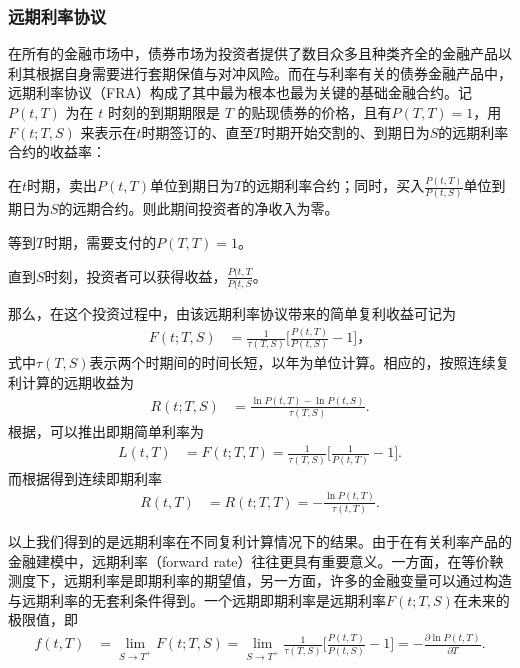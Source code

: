\subsubsection{远期利率协议}
在所有的金融市场中，债券市场为投资者提供了数目众多且种类齐全的金融产品以利其根据自身需要进行套期保值与对冲风险。而在与利率有关的债券金融产品中，远期利率协议（FRA）构成了其中最为根本也最为关键的基础金融合约。记$P(t,T)$ 为在 $t$ 时刻的到期期限是 $T$ 的贴现债券的价格，且有$P(T,T)=1$，用 $F(t; T, S)$ 来表示在$t$时期签订的、直至$T$时期开始交割的、到期日为$S$的远期利率合约的收益率：
\begin{compactitem}
 \item 在$t$时期，卖出$P(t,T)$单位到期日为$T$的远期利率合约；同时，买入$\frac{P(t,T)}{P(t,S)}$单位到期日为$S$的远期合约。则此期间投资者的净收入为零。
 \item 等到$T$时期，需要支付的$P(T,T)=1$。
 \item 直到$S$时刻，投资者可以获得收益，$\frac{P(t,T}{P(t,S}$。
\end{compactitem}
那么，在这个投资过程中，由该远期利率协议带来的简单复利收益可记为
\begin{align}
F(t; T, S) &= \frac{1}{\tau(T,S)}\Big[\frac{P(t,T)}{P(t,S)} - 1 \Big]， \label{forward-spot}
\end{align}
式中$\tau(T,S)$表示两个时期间的时间长短，以年为单位计算。相应的，按照连续复利计算的远期收益为
\begin{align}
R(t; T, S) &= \frac{\ln P(t,T) - \ln P(t,S)}{\tau(T,S)}. \label{forward-comp}
\end{align}
根据，可以推出即期简单利率为
\begin{align}
L(t, T) &= F(t; T, T) = \frac{1}{\tau(T,S)}\Big[\frac{1}{P(t,T)} - 1 \Big].
\end{align}
而根据得到连续即期利率
\begin{align}
R(t, T) &= R(t; T, T) = -\frac{\ln P(t,T)}{\tau(t,T)}.
\end{align}

以上我们得到的是远期利率在不同复利计算情况下的结果。由于在有关利率产品的金融建模中，远期利率（forward rate）往往更具有重要意义。一方面，在等价鞅测度下，远期利率是即期利率的期望值，另一方面，许多的金融变量可以通过构造与远期利率的无套利条件得到。一个远期即期利率是远期利率$F(t; T, S)$在未来的极限值，即
\begin{align}
f(t,T) &= \lim_{S\rightarrow T^+} F(t; T, S) = \lim_{S\rightarrow T^+} \frac{1}{\tau(T,S)}\Big[\frac{P(t,T)}{P(t,S)} - 1 \Big] 
= - \frac{\partial \ln P(t,T)}{\partial T}. \label{forward}
\end{align}

